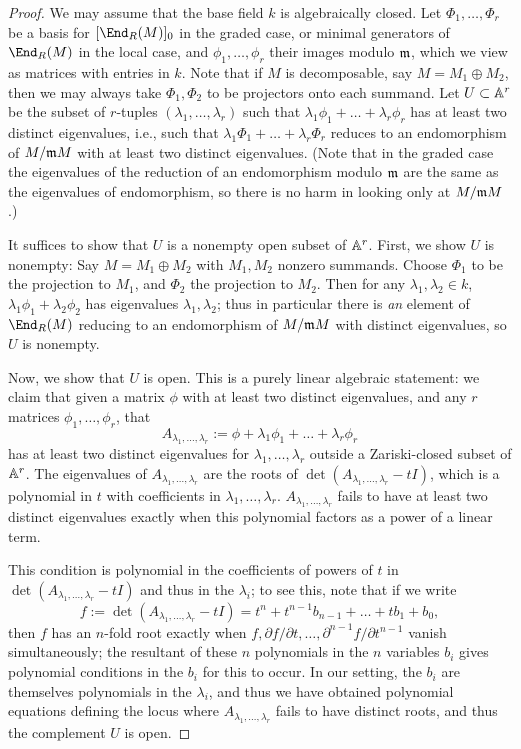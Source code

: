 \documentclass[12pt]{article}
\let\d\partial
\theoremstyle{theorem}
\numberwithin{thm}{section}
\theoremstyle{definition}
\begin{document}
\begin{proof}
  We may assume that the base field $k$ is algebraically closed.
  Let $\Phi_1,\dots,\Phi_r$ be a basis for $[\End_R(M)]_0$ in the graded case, or minimal generators of $\End_R(M)$ in the local case, and $\phi_1,\dots,\phi_r$ their images modulo $\mathfrak m$, which we view as matrices with entries in $k$.
  Note that if $M$ is decomposable, say $M=M_1\oplus M_2$, then we may always take $\Phi_1,\Phi_2$ to be projectors onto each summand.
  Let $U\subset \mathbb A^r$ be the subset of $r$-tuples $(\lambda_1,\dots,\lambda_r)$ such that $\lambda_1\phi_1+\dots+\lambda_r\phi_r$ has at least two distinct eigenvalues, i.e., such that $\lambda_1\Phi_1+\dots+\lambda_r\Phi_r$ reduces to an endomorphism of $M/\mathfrak m M$ with at least two distinct eigenvalues. (Note that in the graded case the eigenvalues of the reduction of an endomorphism modulo $\mathfrak m$ are the same as the eigenvalues of endomorphism, so there is no harm in looking only at $M/\mathfrak m M$.)

  It suffices to show that $U$ is a nonempty open subset of $\mathbb A^r$. First, we show $U$ is nonempty:
  Say $M=M_1\oplus M_2$ with $M_1,M_2$  nonzero  summands. Choose $\Phi_1$ to be the projection to $M_1$, and $\Phi_2$ the projection to $M_2$. Then for any $\lambda_1,\lambda_2\in k$, $\lambda_1\phi_1 + \lambda_2\phi_2$ has eigenvalues $\lambda_1,\lambda_2$; thus in particular there is \emph{an} element of $\End_R(M)$ reducing to an endomorphism of $M/\mathfrak m M$ with distinct eigenvalues, so $U$ is nonempty.

  Now, we show that $U$ is open. This is a purely linear algebraic statement: we claim that given a matrix $\phi$ with at least two distinct eigenvalues, and any $r$ matrices $\phi_1,\dots,\phi_r$, that
  $$ A_{\lambda_1,\dots,\lambda_r}:=\phi+\lambda_1\phi_1+\dots+\lambda_r\phi_r $$
  has at least two distinct eigenvalues for $\lambda_1,\dots,\lambda_r$ outside a Zariski-closed subset of $\mathbb A^r$.
  The eigenvalues of $A_{\lambda_1,\dots,\lambda_r}$ are the roots of $\det(A_{\lambda_1,\dots,\lambda_r}-t I)$, which is a polynomial in $t$ with coefficients in $\lambda_1,\dots,\lambda_r$.
  $A_{\lambda_1,\dots,\lambda_r}$ fails to have at least two distinct eigenvalues exactly when this polynomial factors as a power of a linear term.

  This condition is polynomial in the coefficients of powers of $t$ in $\det(A_{\lambda_1,\dots,\lambda_r}-t I)$ and thus in the $\lambda_i$; to see this, note that
  if we write
  $$ f:=\det(A_{\lambda_1,\dots,\lambda_r}-t I)=t^n  +t^{n-1}b_{n-1}+\dots +t b_1 +b_0, $$
  then $f$
  has an $n$-fold root exactly when
  $ f,\d f/\d t,\dots, \d^{n-1} f/\d t^{n-1} $
  vanish simultaneously; the resultant of these $n$ polynomials in the $n$ variables $b_i$ gives polynomial conditions in the $b_i$ for this to occur.
  In our setting, the $b_i$ are themselves polynomials in the $\lambda_i$, and thus we have obtained polynomial equations defining the locus where $A_{\lambda_1,\dots,\lambda_r}$ fails to have distinct roots, and thus the complement $U$ is open.
\end{proof}
\end{document}
